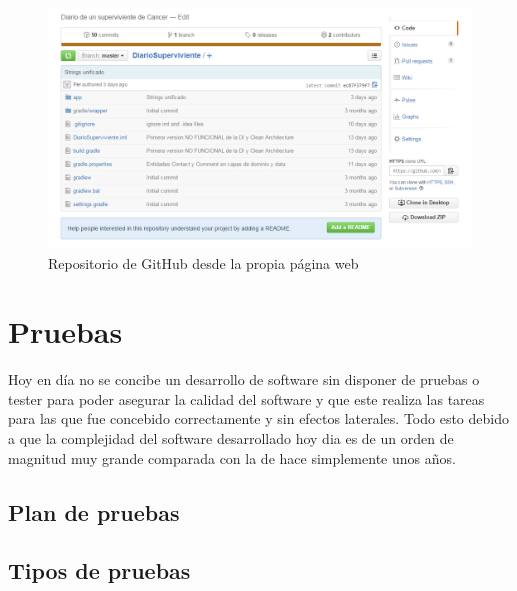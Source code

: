 \documentclass[../pfc.tex]{subfiles}
\begin{document}
	\begin{figure}[H]
		\centering
		\includegraphics[width=1\linewidth]{../images/githubDiarioSuperviviente}
		\caption{Repositorio de GitHub desde la propia página web }
		\label{fig:ghweb}
	\end{figure}

	\clearpage
	
	\section{Pruebas}
	
	Hoy en día no se concibe un desarrollo de software sin disponer de pruebas o tester para poder asegurar la calidad del software y que este realiza las tareas para las que fue concebido correctamente y sin efectos laterales. Todo esto debido a que la complejidad del software desarrollado hoy dia es de un orden de magnitud muy grande comparada con la de hace simplemente unos años.
	
	\subsection{Plan de pruebas}
	
	\subsection{Tipos de pruebas}
		
\end{document}
